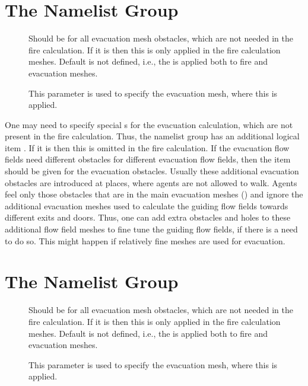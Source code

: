 \documentclass[12pt,a4paper,final,twoside]{stylevk}
\begin{document}
\section{The  Namelist Group}\label{Sec_ObstNML}

\begin{description}
%
\item[] Should be  for all evacuation
  mesh obstacles, which are not needed in the fire calculation.  If it
  is  then this  is only applied in the
  fire calculation meshes.  Default is not defined, i.e., the
   is applied both to fire and evacuation meshes.
%
\item[] This parameter is used to specify the
  evacuation mesh, where this  is applied.
%
\end{description}

One may need to specify special s for the evacuation
calculation, which are not present in the fire calculation.  Thus, the
 namelist group has an additional logical item
.  If it is  then this  is
omitted in the fire calculation.  If the evacuation flow fields need
different obstacles for different evacuation flow fields, then the
item  should be given for the evacuation obstacles.
Usually these additional evacuation obstacles are introduced at
places, where agents are not allowed to walk.  Agents feel only those
obstacles that are in the main evacuation meshes
() and ignore the additional evacuation
meshes used to calculate the guiding flow fields towards different
exits and doors.  Thus, one can add extra obstacles and holes to these
additional flow field meshes to fine tune the guiding flow fields, if
there is a need to do so.  This might happen if relatively fine meshes
are used for evacuation.


\section{The  Namelist Group}\label{Sec_HoleNML}

\begin{description}
%
\item[] Should be  for all evacuation
  mesh obstacles, which are not needed in the fire calculation.  If it
  is  then this  is only applied in the
  fire calculation meshes.  Default is not defined, i.e., the
   is applied both to fire and evacuation meshes.
%
\item[] This parameter is used to specify the
  evacuation mesh, where this  is applied.
%
\end{description}
\end{document}
